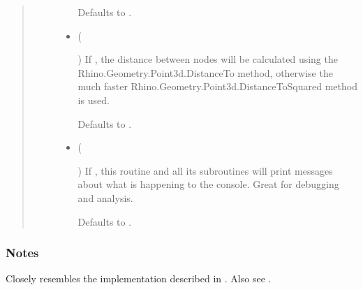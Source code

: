 \documentclass[letterpaper,10pt,english]{sphinxmanual}
\begin{document}
\begin{fulllineitems}
\begin{fulllineitems}
\begin{quote}
\begin{description}
\begin{itemize}
Defaults to .


\item {} 
 (%
\begin{footnote}[124]\sphinxAtStartFootnote
{}
%
\end{footnote}) \textendash{} 
If , the distance between nodes will be calculated using
the Rhino.Geometry.Point3d.DistanceTo method, otherwise the much
faster Rhino.Geometry.Point3d.DistanceToSquared method is used.

Defaults to .


\item {} 
 (%
\begin{footnote}[125]\sphinxAtStartFootnote
{}
%
\end{footnote}\sphinxstyleliteralemphasis{\sphinxupquote{, }}) \textendash{} 
If , this routine and all its subroutines will print
messages about what is happening to the console. Great for
debugging and analysis.

Defaults to .


\end{itemize}

\end{description}\end{quote}
\subsubsection*{Notes}

Closely resembles the implementation described in  \sphinxfootnotemark[1]. Also see
 \sphinxfootnotemark[2].

\end{fulllineitems}


\end{fulllineitems}
\end{document}
